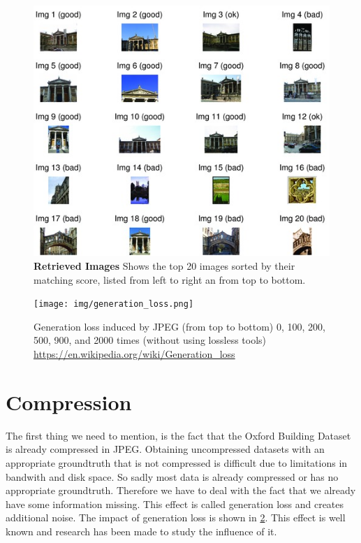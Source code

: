\documentclass[10pt,a4paper]{article}
\begin{document}
\begin{figure}
	\includegraphics[width=\textwidth]{img/retrieved.jpg} 
	\caption{\textbf{Retrieved Images} Shows the top 20 images sorted by their matching score, listed from left to right an from top to bottom.}
	\label{fig:result}
\end{figure}


\FloatBarrier
\begin{figure}
	\texttt{[image: img/generation\_loss.png]}
	\label{fig:g_loss}
	\caption{Generation loss induced by JPEG (from top to bottom) 0, 100, 200, 500, 900, and 2000 times (without using lossless tools) \url{https://en.wikipedia.org/wiki/Generation_loss}} 
\end{figure}
\section{Compression}
\label{sec:compression}The first thing we need to mention, is the fact that the Oxford Building Dataset is already compressed in JPEG. Obtaining uncompressed datasets with an appropriate groundtruth that is not compressed is difficult due to limitations in bandwith and disk space. So sadly most data is already compressed or has no appropriate groundtruth. Therefore we have to deal with the fact that we already have some information missing. This effect is called generation loss and creates additional noise. The impact of generation loss is shown in \ref{fig:g_loss}. This effect is well known and research has been made to study the influence of it\autocite{lai2013block}.
\end{document}
